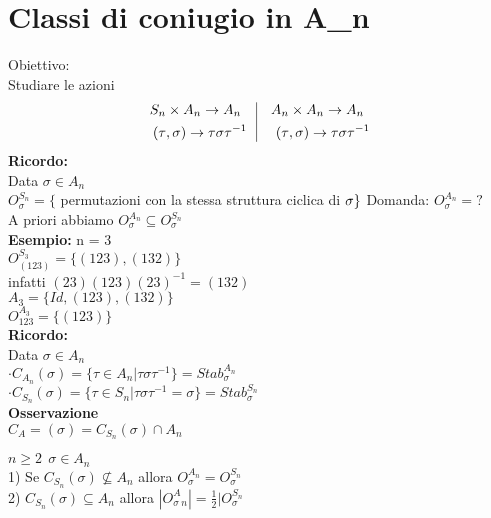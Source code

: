 \documentclass[12px]{article}
\begin{document}
	   \section{Classi di coniugio in A_n}
	   Obiettivo:\\
	   Studiare le azioni
	   \[
	    \begin{aligned}
		    S_n &\times A_n \rightarrow A_n\\
		    (\tau &,\sigma) \rightarrow\tau\sigma\tau^{-1}
	   	
	   \end{aligned} \ \ 
	   \vline \ \ \ 
	   \begin{aligned}
		   A_n&\times A_n \rightarrow A_n\\
		   (\tau&,\sigma) \rightarrow\tau\sigma \tau^{-1}
	   \end{aligned}
   \]
   \textbf{Ricordo:}\\
   Data $\sigma\in A_n$\\
   $O_\sigma^{S_n} = \{$ permutazioni con la stessa struttura ciclica di $\sigma\}\\$
   Domanda:  $O_\sigma^{A_n} = ?$\\
   A priori abbiamo  $O_\sigma^{A_n}\subseteq O_\sigma^{S_n}$\\
    \textbf{Esempio:} n = 3\\
    $O^{S_3}_{(123)} = \{(123),(132)\}$\\
    infatti $(23)(123)(23)^{-1} = (132)$\\
    $A_3 = \{Id,(123),(132)\}$\\
    $O^{A_3}_{123} = \{(123)\}$\\
    \textbf{Ricordo:}\\
    Data $\sigma\in A_n$\\
    $\cdot C_{A_n}(\sigma) = \{\tau\in A_n|\tau\sigma\tau^{-1}\} = Stab^{A_n}_\sigma$\\
    $\cdot C_{S_n}(\sigma) = \{\tau\in S_n | \tau\sigma\tau^{-1} = \sigma\} = Stab_\sigma^{S_n}$\\
     \textbf{Osservazione}\\
     $C_A = (\sigma) = C_{S_n}(\sigma)\cap A_n$\\
      \begin{teo}
     	$n\geq 2 \ \ \sigma \in A_n$ \\
	1) Se $C_{S_n}(\sigma )\not\subseteq A_n$ allora $O_\sigma^{A_n} = O_\sigma^{S_n}$\\
	2) $C_{S_n}(\sigma)\subseteq A_n$ allora $|O_\sigma^A_n| = \frac 12 |O_\sigma^{S_n}$
\end{teo}
\end{document}
